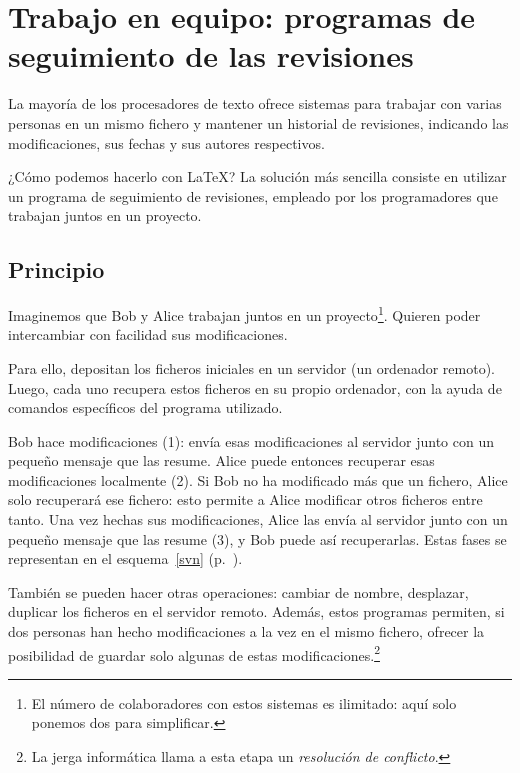 \chapter{Trabajo en equipo: programas de seguimiento de las revisiones}\label{principesvn}    %

\begin{intro} 
    La mayoría de los procesadores de texto ofrece sistemas para trabajar con varias personas en un mismo fichero y mantener un historial de revisiones, indicando las modificaciones, sus fechas y sus autores respectivos. 
    
    ¿Cómo podemos hacerlo con \LaTeX{}? La solución más sencilla consiste en utilizar un programa de seguimiento de revisiones, empleado por los programadores que trabajan juntos en un proyecto.
\end{intro}

\section{Principio}
Imaginemos que Bob y Alice trabajan juntos en un proyecto\footnote{El número de colaboradores con estos sistemas es ilimitado: aquí solo ponemos dos para simplificar.}. Quieren poder intercambiar con facilidad sus modificaciones.

Para ello, depositan los ficheros iniciales en un servidor (un ordenador remoto). Luego, cada uno recupera estos ficheros en su propio ordenador, con la ayuda de comandos específicos del programa utilizado.

Bob hace modificaciones (1): envía esas modificaciones al servidor junto con un pequeño mensaje que las resume. Alice puede entonces recuperar esas modificaciones localmente (2). Si Bob no ha modificado más que un fichero, Alice solo recuperará ese fichero: esto permite a Alice modificar otros ficheros entre tanto. Una vez hechas sus modificaciones, Alice las envía al servidor junto con un pequeño mensaje que las resume (3), y Bob puede así recuperarlas. Estas fases se representan en el esquema~\ref{svn} (p.~\pageref{svn}). 

También se pueden hacer otras operaciones: cambiar de nombre, desplazar, duplicar los ficheros en el servidor remoto. Además, estos programas permiten, si dos personas han hecho modificaciones a la vez en el mismo fichero, ofrecer la posibilidad de guardar solo algunas de estas modificaciones.\footnote{La jerga informática llama a esta etapa un \emph{resolución de conflicto}.}

